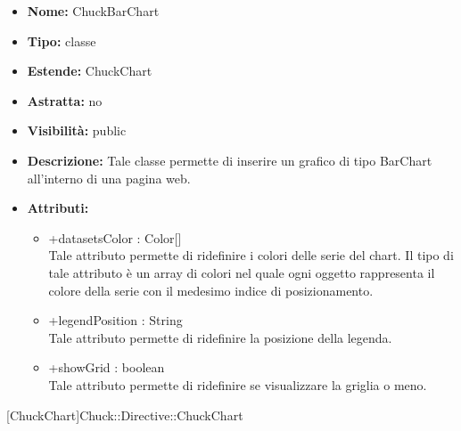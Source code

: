 			
			\begin{itemize}
			\item \textbf{Nome:} ChuckBarChart
			\item \textbf{Tipo:} classe
			
		\item \textbf{Estende:}
		ChuckChart
		\item \textbf{Astratta:}
		no
			\item \textbf{Visibilità:} public
			\item \textbf{Descrizione:} Tale classe permette di inserire un grafico di tipo BarChart all'interno di una pagina web.
			\item \textbf{Attributi:}
				\begin{itemize}
				\setlength{\itemsep}{5pt}
				
					\item[\ding{111}] {+datasetsColor : Color[]} \\ [1mm] Tale attributo permette di ridefinire i colori delle serie del chart.  Il tipo di tale attributo è un array di colori nel quale ogni oggetto rappresenta il colore della serie con il medesimo indice di posizionamento.
					\item[\ding{111}] {+legendPosition : String} \\ [1mm] Tale attributo permette di ridefinire la posizione della legenda.
					\item[\ding{111}] {+showGrid : boolean} \\ [1mm] Tale attributo permette di ridefinire se visualizzare la griglia o meno.
				\end{itemize}
		
			\end{itemize}

			
			[ChuckChart]{Chuck::Directive::ChuckChart}
			

	
